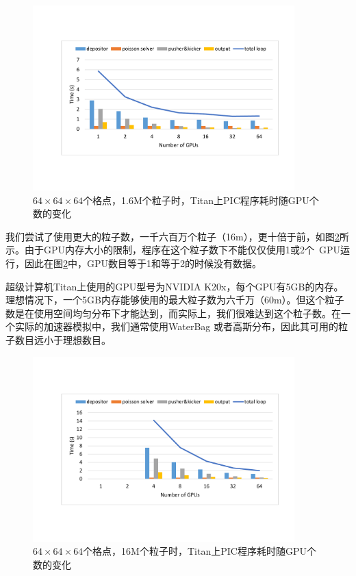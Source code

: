 \begin{figure}[!htb]
  \centering
  \includegraphics[width=0.9\textwidth]{Img/PIC_speedup_Titan_1_6m.pdf}
  \caption{$64 \times 64 \times 64$个格点，1.6M个粒子时，Titan上PIC程序耗时随GPU个数的变化}
  \label{fig:PIC_speedup_Titan_1_6m}
\end{figure}

我们尝试了使用更大的粒子数，一千六百万个粒子（16m），更十倍于前，如图\ref{fig:PIC_speedup_Titan_16m}所示。由于GPU内存大小的限制，程序在这个粒子数下不能仅仅使用1或2个~GPU运行，因此在图\ref{fig:PIC_speedup_Titan_16m}中，GPU数目等于1和等于2的时候没有数据。

超级计算机Titan上使用的GPU型号为NVIDIA K20x，每个GPU有5GB的内存。理想情况下，一个5GB内存能够使用的最大粒子数为六千万（60m）。但这个粒子数是在使用空间均匀分布下才能达到，而实际上，我们很难达到这个粒子数。在一个实际的加速器模拟中，我们通常使用WaterBag 或者高斯分布，因此其可用的粒子数目远小于理想数目。

\begin{figure}[!htb]
  \centering
  \includegraphics[width=0.9\textwidth]{Img/PIC_speedup_Titan_16m.pdf}
  \caption{$64 \times 64 \times 64$个格点，16M个粒子时，Titan上PIC程序耗时随GPU个数的变化}
  \label{fig:PIC_speedup_Titan_16m}
\end{figure}

